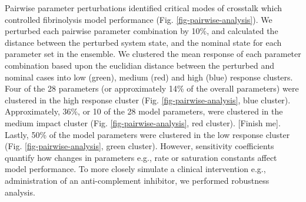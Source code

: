 \documentclass[12pt]{article}
\begin{document}
Pairwise parameter perturbations identified critical modes of crosstalk which controlled fibrinolysis model performance (Fig. \ref{fig-pairwise-analysis}).
We perturbed each pairwise parameter combination by 10\%, and calculated the distance between the perturbed system state, and the nominal state for each parameter set in the ensemble.
We clustered the mean response of each parameter combination based upon the euclidian distance between the perturbed and nominal cases into low (green), medium (red) and high (blue) response clusters.
Four of the 28 parameters (or approximately 14\% of the overall parameters) were clustered in the high response cluster (Fig. \ref{fig-pairwise-analysis}, blue cluster).
Approximately, 36\%, or 10 of the 28 model parameters, were clustered in the medium impact cluster (Fig. \ref{fig-pairwise-analysis}, red cluster). [Finish me].
Lastly,  50\% of the model parameters were clustered in the low response cluster (Fig. \ref{fig-pairwise-analysis}, green cluster).
However, sensitivity coefficients quantify how changes in parameters e.g., rate or saturation constants affect model performance.
To more closely simulate a clinical intervention e.g., administration of an anti-complement inhibitor, we performed robustness analysis.
\end{document}
